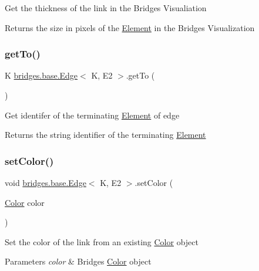 Get the thickness of the link in the Bridges Visualiation

\begin{DoxyReturn}{Returns}
the size in pixels of the \mbox{\hyperlink{classbridges_1_1base_1_1_element}{Element}} in the Bridges Visualization 
\end{DoxyReturn}
\mbox{\label{classbridges_1_1base_1_1_edge_ab451c13aa8173b5ef1cc2b2dd4f8508f}} 
\subsubsection{\texorpdfstring{getTo()}{getTo()}}
{\footnotesize\ttfamily K \mbox{\hyperlink{classbridges_1_1base_1_1_edge}{bridges.\+base.\+Edge}}$<$ K, E2 $>$.get\+To (\begin{DoxyParamCaption}{ }\end{DoxyParamCaption})}

Get identifer of the terminating \mbox{\hyperlink{classbridges_1_1base_1_1_element}{Element}} of edge

\begin{DoxyReturn}{Returns}
the string identifier of the terminating \mbox{\hyperlink{classbridges_1_1base_1_1_element}{Element}} 
\end{DoxyReturn}
\mbox{\label{classbridges_1_1base_1_1_edge_a77f6d36e94a3cbb8e478c85a1a6dad84}} 
\subsubsection{\texorpdfstring{setColor()}{setColor()}\hspace{0.1cm}{\footnotesize\ttfamily [1/3]}}
{\footnotesize\ttfamily void \mbox{\hyperlink{classbridges_1_1base_1_1_edge}{bridges.\+base.\+Edge}}$<$ K, E2 $>$.set\+Color (\begin{DoxyParamCaption}\item[{\mbox{\hyperlink{classbridges_1_1base_1_1_color}{Color}}}]{color }\end{DoxyParamCaption})}

Set the color of the link from an existing \mbox{\hyperlink{classbridges_1_1base_1_1_color}{Color}} object 
\begin{DoxyParams}{Parameters}
{\em color} & Bridges \mbox{\hyperlink{classbridges_1_1base_1_1_color}{Color}} object \\
\hline
\end{DoxyParams}
\mbox{\label{classbridges_1_1base_1_1_edge_adc2dbd9f8d74f8749ba64515ca052909}} 
